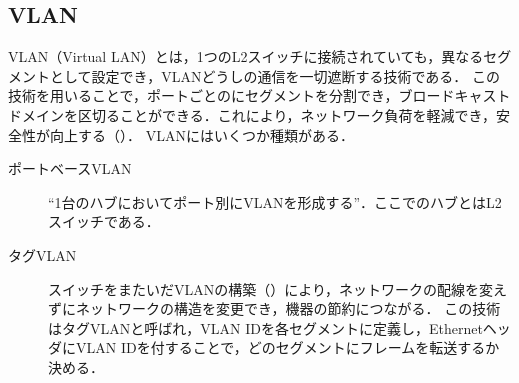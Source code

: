 \subsection{VLAN}
VLAN（Virtual LAN）とは，1つのL2スイッチに接続されていても，異なるセグメントとして設定でき，VLANどうしの通信を一切遮断する技術である．
この技術を用いることで，ポートごとのにセグメントを分割でき，ブロードキャストドメインを区切ることができる．これにより，ネットワーク負荷を軽減でき，安全性が向上する（）．
VLANにはいくつか種類がある．
\begin{description}
    \item[ポートベースVLAN] ``1台のハブにおいてポート別にVLANを形成する''\cite[p.71]{ネットワーク工学}．ここでのハブとはL2スイッチである．
    \item[タグVLAN] スイッチをまたいだVLANの構築（）により，ネットワークの配線を変えずにネットワークの構造を変更でき，機器の節約につながる．
        この技術はタグVLANと呼ばれ，VLAN IDを各セグメントに定義し，EthernetヘッダにVLAN IDを付することで，どのセグメントにフレームを転送するか決める\cite[p.105\ -\ p.106]{マスタリングTCPIP}．
\end{description}
